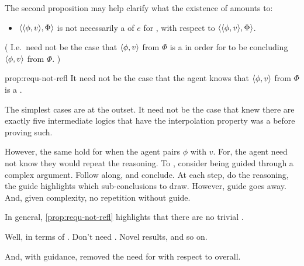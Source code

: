 \begin{note}
  The second proposition may help clarify what the existence of  amounts to:

  \begin{proposition}
    \label{prop:requ-not-refl}

    \begin{itemize}
    \item
      \(\langle \langle \phi, v \rangle, \Phi \rangle\) is not necessarily a \emph{\requ{}} of \(e\) for \vAgent{}, with respect to \(\langle \langle \phi, v \rangle, \Phi \rangle\).
    \end{itemize}

    (%
    I.e.\ need not be the case that \(\langle \phi, v \rangle\) from \(\Phi\) is a \fc{} in order for \vAgent{} to be concluding \(\langle \phi, v \rangle\) from \(\Phi\).%
    )
  \end{proposition}
  \begin{argument}{prop:requ-not-refl}
    It need not be the case that the agent knows that \(\langle \phi, v \rangle\) from \(\Phi\) is a \fc{}.

    The simplest cases are at the outset.
    It need not be the case that \citeauthor{Maksimova:1977un} knew there are exactly five intermediate logics that have the interpolation property was a \fc{} before proving such.

    However, the same hold for when the agent pairs \(\phi\) with \(v\).
    For, the agent need not know they would repeat the reasoning.
    To , consider being guided through a complex argument.
    Follow along, and conclude.
    At each step, do the reasoning, the guide highlights which sub-conclusions to draw.
    However, guide goes away.
    And, given complexity, no repetition without guide.
  \end{argument}

  In general, \autoref{prop:requ-not-refl} highlights that there are no trivial .

  Well, in terms of \sR{}.
  Don't need \sR{}.
  Novel results, and so on.

  And, with guidance, removed the need for \sR{} with respect to overall.
\end{note}

